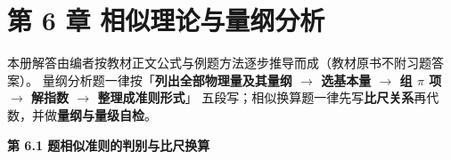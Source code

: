 \chapter*{第 6 章 相似理论与量纲分析}

\begin{tishi}
本册解答由编者按教材正文公式与例题方法逐步推导而成（教材原书不附习题答案）。
量纲分析题一律按「\textbf{列出全部物理量及其量纲 $\to$ 选基本量 $\to$ 组 $\pi$ 项 $\to$ 解指数 $\to$ 整理成准则形式}」
五段写；相似换算题一律先写\textbf{比尺关系}再代数，并做\textbf{量纲与量级自检}。
\end{tishi}

\noindent\textbf{第 6.1 题\quad 相似准则的判别与比尺换算}

